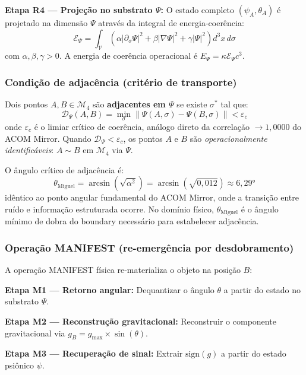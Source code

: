\documentclass[12pt,a4paper]{article}
\newcommand{\alphaii}{\alpha^2}
\newcommand{\Dpsi}{\mathcal{D}_\Psi}
\newcommand{\Epsi}{\mathcal{E}_\Psi}
\newcommand{\Mcal}{\mathcal{M}_4}
\newcommand{\thetaM}{\theta_{\text{Miguel}}}
\newcommand{\epsc}{\varepsilon_c}
\begin{document}
\textbf{Etapa R4 --- Projeção no substrato $\Psi$:} O estado
completo $(\psi_A, \theta_A)$ é projetado na dimensão $\Psi$
através da integral de energia-coerência:
\begin{equation}
\Epsi = \int_{\mathcal{V}} \left(
  \alpha |\partial_\sigma \Psi|^2 +
  \beta |\nabla \Psi|^2 +
  \gamma |\Psi|^2
  \right) d^3x\, d\sigma
\label{eq:energia}
\end{equation}
com $\alpha, \beta, \gamma > 0$. A energia de coerência
operacional é $E_\Psi = \kappa \Epsi c^3$.

\subsubsection{Condição de adjacência (critério de transporte)}

Dois pontos $A, B \in \Mcal$ são \textbf{adjacentes em $\Psi$}
se existe $\sigma^*$ tal que:
\begin{equation}
\Dpsi(A,B) = \min_\sigma
  \|\Psi(A,\sigma) - \Psi(B,\sigma)\| < \epsc
\label{eq:adjacencia}
\end{equation}
onde $\epsc$ é o limiar crítico de coerência, análogo direto da
correlação $\to 1{,}0000$ do ACOM Mirror. Quando $\Dpsi < \epsc$,
os pontos $A$ e $B$ são \textit{operacionalmente identificáveis}:
$A \sim B$ em $\Mcal$ via $\Psi$.

O ângulo crítico de adjacência é:
\begin{equation}
\thetaM = \arcsin(\sqrt{\alphaii}) =
  \arcsin(\sqrt{0{,}012}) \approx 6{,}29°
\end{equation}
idêntico ao ponto angular fundamental do ACOM Mirror, onde a
transição entre ruído e informação estruturada ocorre. No
domínio físico, $\thetaM$ é o ângulo mínimo de dobra do
boundary necessário para estabelecer adjacência.

\subsubsection{Operação MANIFEST (re-emergência por
desdobramento)}

A operação MANIFEST física re-materializa o objeto na posição
$B$:

\textbf{Etapa M1 --- Retorno angular:} Dequantizar o ângulo
$\theta$ a partir do estado no substrato $\Psi$.

\textbf{Etapa M2 --- Reconstrução gravitacional:} Reconstruir
o componente gravitacional via $g_B = g_{\max} \times
\sin(\theta)$.

\textbf{Etapa M3 --- Recuperação de sinal:} Extrair
$\text{sign}(g)$ a partir do estado psiônico $\psi$.
\end{document}
